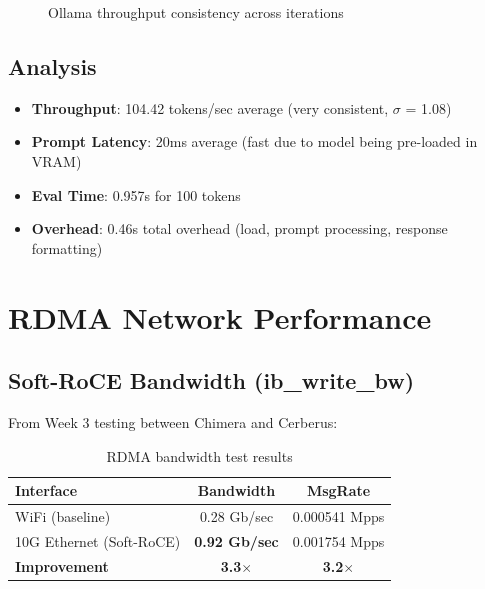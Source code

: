 \documentclass[10pt,letterpaper]{article}
\begin{document}
\begin{figure}[H]
\centering
{}
\caption{Ollama throughput consistency across iterations}
\end{figure}

\subsection{Analysis}

\begin{itemize}[noitemsep]
    \item \textbf{Throughput}: 104.42 tokens/sec average (very consistent, $\sigma$ = 1.08)
    \item \textbf{Prompt Latency}: 20ms average (fast due to model being pre-loaded in VRAM)
    \item \textbf{Eval Time}: 0.957s for 100 tokens
    \item \textbf{Overhead}: 0.46s total overhead (load, prompt processing, response formatting)
\end{itemize}

\section{RDMA Network Performance}

\subsection{Soft-RoCE Bandwidth (ib\_write\_bw)}

From Week 3 testing between Chimera and Cerberus:

\begin{table}[H]
\centering
\small
\begin{tabular}{@{}lcc@{}}
\toprule
\textbf{Interface} & \textbf{Bandwidth} & \textbf{MsgRate} \\
\midrule
WiFi (baseline) & 0.28 Gb/sec & 0.000541 Mpps \\
10G Ethernet (Soft-RoCE) & \textbf{0.92 Gb/sec} & 0.001754 Mpps \\
\midrule
\textbf{Improvement} & \textbf{3.3$\times$} & \textbf{3.2$\times$} \\
\bottomrule
\end{tabular}
\caption{RDMA bandwidth test results}
\end{table}
\end{document}
